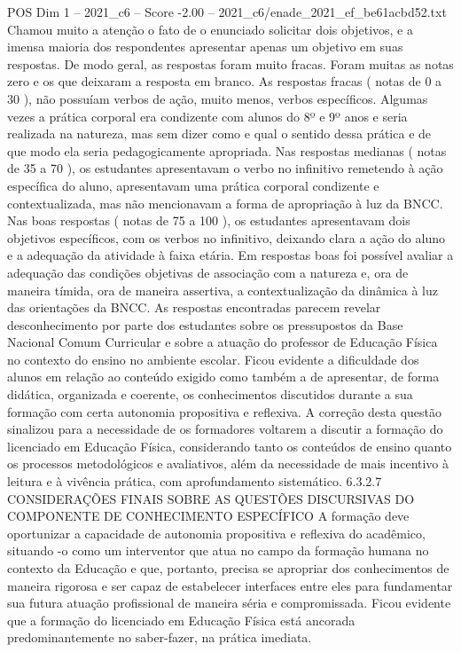 \begin{textsample}{POS Dim 1 – 2021\_c6 – Score -2.00 – 2021\_c6/enade\_2021\_ef\_be61acbd52.txt}
Chamou muito a atenção o fato de o enunciado solicitar dois objetivos, e a imensa maioria dos respondentes apresentar apenas um objetivo em suas respostas.
De modo geral, as respostas foram muito fracas.
Foram muitas as notas zero e os que deixaram a resposta em branco.
As respostas fracas ( notas de 0 a 30 ), não possuíam verbos de ação, muito menos, verbos específicos.
Algumas vezes a prática corporal era condizente com alunos do 8º e 9º anos e seria realizada na natureza, mas sem dizer como e qual o sentido dessa prática e de que modo ela seria pedagogicamente apropriada.
Nas respostas medianas ( notas de 35 a 70 ), os estudantes apresentavam o verbo no infinitivo remetendo à ação específica do aluno, apresentavam uma prática corporal condizente e contextualizada, mas não mencionavam a forma de apropriação à luz da BNCC.
Nas boas respostas ( notas de 75 a 100 ), os estudantes apresentavam dois objetivos específicos, com os verbos no infinitivo, deixando clara a ação do aluno e a adequação da atividade à faixa etária.
Em respostas boas foi possível avaliar a adequação das condições objetivas de associação com a natureza e, ora de maneira tímida, ora de maneira assertiva, a contextualização da dinâmica à luz das orientações da BNCC.
As respostas encontradas parecem revelar desconhecimento por parte dos estudantes sobre os pressupostos da Base Nacional Comum Curricular e sobre a atuação do professor de Educação Física no contexto do ensino no ambiente escolar.
Ficou evidente a dificuldade dos alunos em relação ao conteúdo exigido como também a de apresentar, de forma didática, organizada e coerente, os conhecimentos discutidos durante a sua formação com certa autonomia propositiva e reflexiva.
A correção desta questão sinalizou para a necessidade de os formadores voltarem a discutir a formação do licenciado em Educação Física, considerando tanto os conteúdos de ensino quanto os processos metodológicos e avaliativos, além da necessidade de mais incentivo à leitura e à vivência prática, com aprofundamento sistemático. 6.3.2.7 CONSIDERAÇÕES FINAIS SOBRE AS QUESTÕES DISCURSIVAS DO COMPONENTE DE CONHECIMENTO ESPECÍFICO A formação deve oportunizar a capacidade de autonomia propositiva e reflexiva do acadêmico, situando -o como um interventor que atua no campo da formação humana no contexto da Educação e que, portanto, precisa se apropriar dos conhecimentos de maneira rigorosa e ser capaz de estabelecer interfaces entre eles para fundamentar sua futura atuação profissional de maneira séria e compromissada.
Ficou evidente que a formação do licenciado em Educação Física está ancorada predominantemente no saber-fazer, na prática imediata.

\end{textsample}
